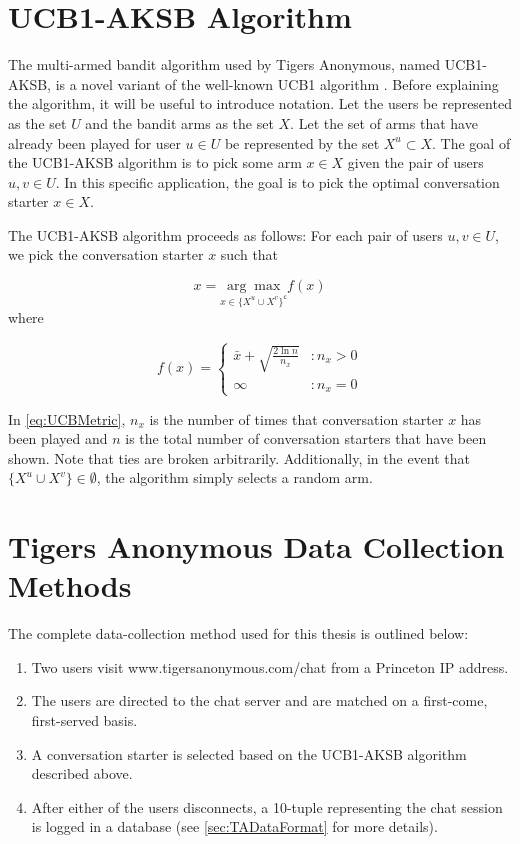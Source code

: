\section{UCB1-AKSB Algorithm}

The multi-armed bandit algorithm used by Tigers Anonymous, named UCB1-AKSB, is a novel variant of the well-known UCB1 algorithm \citep{auer02}. Before explaining the algorithm, it will be useful to introduce notation. Let the users be represented as the set $U$ and the bandit arms as the set $X$. Let the set of arms that have already been played for user $u\in{U}$ be represented by the set $X^u \subset{X}$. The goal of the UCB1-AKSB algorithm is to pick some arm $x\in{X}$ given the pair of users $u,v \in{U}$. In this specific application, the goal is to pick the optimal conversation starter $x\in{X}$.

The UCB1-AKSB algorithm proceeds as follows: For each pair of users $u,v\in{U}$, we pick the conversation starter $x$ such that

\begin{equation}
\label{eq:UCBMain}
x = \underset{x \in{\{X^u \cup X^v\}}^{\mathsf{c}}}{\arg\max{}} f(x)
\end{equation}
where

\begin{equation}
\label{eq:UCBMetric}
   f(x) = \left\{
     \begin{array}{lr}
       \bar{x}+ \sqrt{\frac{2\ln{n}}{n_x}} & : n_x > 0\\
       \infty & : n_x = 0
     \end{array}
   \right.
\end{equation}

In \autoref{eq:UCBMetric}, $n_x$ is the number of times that conversation starter $x$ has been played and $n$ is the total number of conversation starters that have been shown. Note that ties are broken arbitrarily. Additionally, in the event that $\{X^u \cup X^v\} \in \emptyset$, the algorithm simply selects a random arm.

\section{Tigers Anonymous Data Collection Methods}

The complete data-collection method used for this thesis is outlined below: 

\begin{enumerate}
\item Two users visit www.tigersanonymous.com/chat from a Princeton IP address.
\item The users are directed to the chat server and are matched on a first-come, first-served basis.
\item A conversation starter is selected based on the UCB1-AKSB algorithm described above.
\item After either of the users disconnects, a 10-tuple representing the chat session is logged in a database (see \autoref{sec:TADataFormat} for more details).
\end{enumerate}

